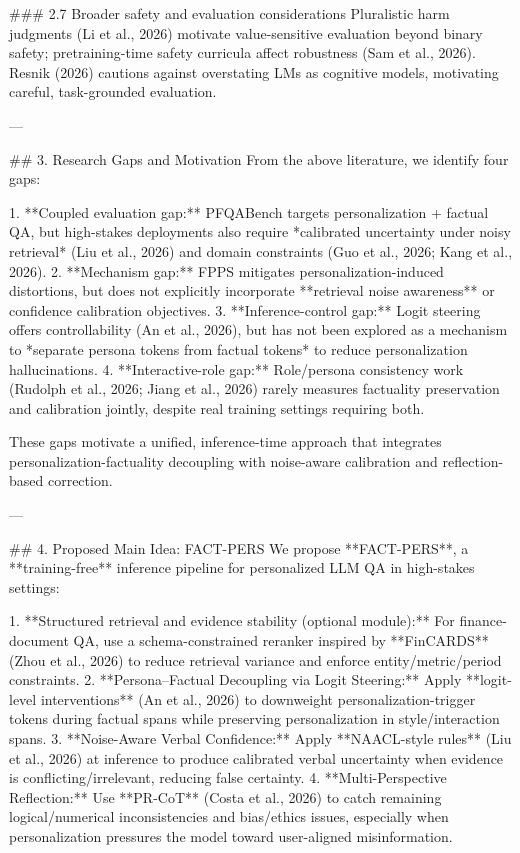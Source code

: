 ### 2.7 Broader safety and evaluation considerations  
Pluralistic harm judgments (Li et al., 2026) motivate value-sensitive evaluation beyond binary safety; pretraining-time safety curricula affect robustness (Sam et al., 2026). Resnik (2026) cautions against overstating LMs as cognitive models, motivating careful, task-grounded evaluation.

---

## 3. Research Gaps and Motivation  
From the above literature, we identify four gaps:

1. **Coupled evaluation gap:** PFQABench targets personalization + factual QA, but high-stakes deployments also require *calibrated uncertainty under noisy retrieval* (Liu et al., 2026) and domain constraints (Guo et al., 2026; Kang et al., 2026).  
2. **Mechanism gap:** FPPS mitigates personalization-induced distortions, but does not explicitly incorporate **retrieval noise awareness** or confidence calibration objectives.  
3. **Inference-control gap:** Logit steering offers controllability (An et al., 2026), but has not been explored as a mechanism to *separate persona tokens from factual tokens* to reduce personalization hallucinations.  
4. **Interactive-role gap:** Role/persona consistency work (Rudolph et al., 2026; Jiang et al., 2026) rarely measures factuality preservation and calibration jointly, despite real training settings requiring both.

These gaps motivate a unified, inference-time approach that integrates personalization-factuality decoupling with noise-aware calibration and reflection-based correction.

---

## 4. Proposed Main Idea: FACT-PERS  
We propose **FACT-PERS**, a **training-free** inference pipeline for personalized LLM QA in high-stakes settings:

1. **Structured retrieval and evidence stability (optional module):** For finance-document QA, use a schema-constrained reranker inspired by **FinCARDS** (Zhou et al., 2026) to reduce retrieval variance and enforce entity/metric/period constraints.  
2. **Persona–Factual Decoupling via Logit Steering:** Apply **logit-level interventions** (An et al., 2026) to downweight personalization-trigger tokens during factual spans while preserving personalization in style/interaction spans.  
3. **Noise-Aware Verbal Confidence:** Apply **NAACL-style rules** (Liu et al., 2026) at inference to produce calibrated verbal uncertainty when evidence is conflicting/irrelevant, reducing false certainty.  
4. **Multi-Perspective Reflection:** Use **PR-CoT** (Costa et al., 2026) to catch remaining logical/numerical inconsistencies and bias/ethics issues, especially when personalization pressures the model toward user-aligned misinformation.

